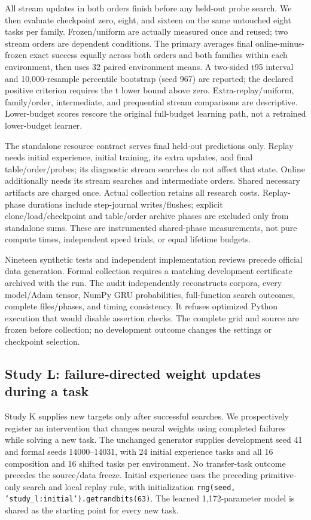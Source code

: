 \documentclass[11pt]{article}
\begin{document}
All stream updates in both orders finish before any held-out probe search.
We then evaluate checkpoint zero, eight, and sixteen on the same untouched
eight tasks per family. Frozen/uniform are actually measured once and reused;
two stream orders are dependent conditions. The primary averages final
online-minus-frozen exact success equally across both orders and both families
within each environment, then uses 32 paired environment means. A two-sided
t95 interval and 10,000-resample percentile bootstrap (seed 967) are reported;
the declared positive criterion requires the t lower bound above zero.
Extra-replay/uniform, family/order, intermediate, and prequential stream
comparisons are descriptive. Lower-budget scores rescore the original
full-budget learning path, not a retrained lower-budget learner.

The standalone resource contract serves final held-out predictions only.
Replay needs initial experience, initial training, its extra updates, and
final table/order/probes; its diagnostic stream searches do not affect that
state. Online additionally needs its stream searches and intermediate orders.
Shared necessary artifacts are charged once. Actual collection retains all
research costs. Replay-phase durations include step-journal writes/flushes;
explicit clone/load/checkpoint and table/order archive phases are excluded
only from standalone sums. These are instrumented shared-phase measurements,
not pure compute times, independent speed trials, or equal lifetime budgets.

Nineteen synthetic tests and independent implementation reviews precede
official data generation. Formal collection requires a matching development
certificate archived with the run. The audit independently reconstructs
corpora, every model/Adam tensor, NumPy GRU probabilities, full-function
search outcomes, complete files/phases, and timing consistency. It refuses
optimized Python execution that would disable assertion checks. The complete
grid and source are frozen before collection; no development outcome changes
the settings or checkpoint selection.

\subsection{Study L: failure-directed weight updates during a task}
Study K supplies new targets only after successful searches. We prospectively register
an intervention that changes neural weights using completed failures while
solving a new task. The unchanged generator supplies development seed 41 and
formal seeds 14000--14031, with 24 initial experience tasks and all 16
composition and 16 shifted tasks per environment. No transfer-task outcome
precedes the source/data freeze. Initial experience uses the preceding
primitive-only search and local replay rule, with initialization
\texttt{rng(seed, 'study\_l:initial').getrandbits(63)}. The learned 1,172-parameter model is
shared as the starting point for every new task.
\end{document}
